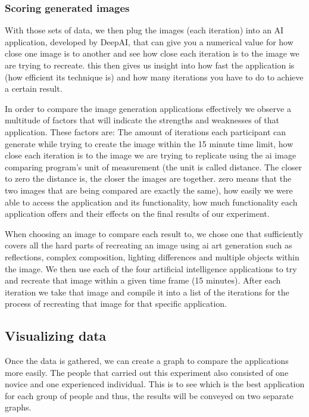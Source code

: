 \documentclass[]{report}
\begin{document}
	\subsubsection{Scoring generated images}
	With those sets of data, we then plug the images (each iteration) into an AI application, developed by DeepAI, that can give you a numerical value for how close one image is to another and see how close each iteration is to the image we are trying to recreate. this then gives us insight into how fast the application is (how efficient its technique is) and how many iterations you have to do to achieve a certain result.
	
	In order to compare the image generation applications effectively we observe a multitude of factors that will indicate the strengths and weaknesses of that application. These factors are: The amount of iterations each participant can generate while trying to create the image within the 15 minute time limit, how close each iteration is to the image we are trying to replicate using the ai image comparing program's unit of measurement (the unit is called distance. The closer to zero the distance is, the closer the images are together. zero means that the two images that are being compared are exactly the same), how easily we were able to access the application and its functionality, how much functionality each application offers and their effects on the final results of our experiment.
	
	When choosing an image to compare each result to, we chose one that sufficiently covers all the hard parts of recreating an image using ai art generation such as reflections, complex composition, lighting differences and multiple objects within the image. We then use each of the four artificial intelligence applications to try and recreate that image within a given time frame (15 minutes). After each iteration we take that image and compile it into a list of the iterations for the process of recreating that image for that specific application.
	
	\subsection{Visualizing data}
	
	Once the data is gathered, we can create a graph to compare the applications more easily. The people that carried out this experiment also consisted of one novice and one experienced individual. This is to see which is the best application for each group of people and thus, the results will be conveyed on two separate graphs.
	
\end{document}
